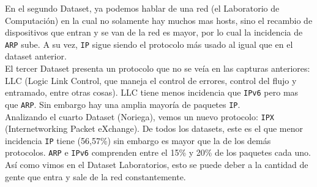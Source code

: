 En el segundo Dataset, ya podemos hablar de una red (el Laboratorio de Computación) en la cual no solamente hay muchos mas hosts, sino el recambio de dispositivos que entran y se van de la red es mayor, por lo cual la incidencia de \texttt{ARP} sube. A su vez, \texttt{IP} sigue siendo el protocolo más usado al igual que en el dataset anterior. \\

El tercer Dataset presenta un protocolo que no se veía en las capturas anteriores: LLC (Logic Link Control, que maneja el control de errores, control del flujo y entramado, entre otras cosas). LLC tiene menos incidencia que \texttt{IPv6} pero mas que \texttt{ARP}. Sin embargo hay una amplia mayoría de paquetes \texttt{IP}. \\

Analizando el cuarto Dataset (Noriega), vemos un nuevo protocolo: \texttt{IPX} (Internetworking Packet eXchange). De todos los datasets, este es el que menor incidencia \texttt{IP} tiene (56,57\%) sin embargo es mayor que la de los demás protocolos. \texttt{ARP} e \texttt{IPv6} comprenden entre el 15\% y 20\% de los paquetes cada uno. Así como vimos en el Dataset Laboratorios, esto se puede deber a la cantidad de gente que entra y sale de la red constantemente. \\





